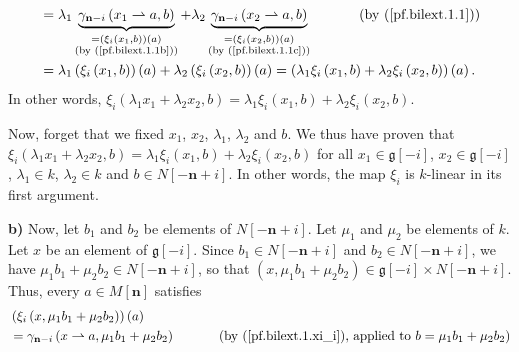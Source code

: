 \documentclass[etingof-lie.tex]{subfiles}
\begin{document}
\begin{noncompile}
{\begin{align*}
&  =\lambda_{1}\underbrace{\gamma_{\mathbf{n}-i}\left(  x_{1}\rightharpoonup
a,b\right)  }_{\substack{=\left(  \xi_{i}\left(  x_{1},b\right)  \right)
\left(  a\right)  \\\text{(by (\ref{pf.bilext.1.1b}))}}}+\lambda
_{2}\underbrace{\gamma_{\mathbf{n}-i}\left(  x_{2}\rightharpoonup a,b\right)
}_{\substack{=\left(  \xi_{i}\left(  x_{2},b\right)  \right)  \left(
a\right)  \\\text{(by (\ref{pf.bilext.1.1c}))}}}\ \ \ \ \ \ \ \ \ \ \left(
\text{by (\ref{pf.bilext.1.1})}\right) \\
&  =\lambda_{1}\left(  \xi_{i}\left(  x_{1},b\right)  \right)  \left(
a\right)  +\lambda_{2}\left(  \xi_{i}\left(  x_{2},b\right)  \right)  \left(
a\right)  =\left(  \lambda_{1}\xi_{i}\left(  x_{1},b\right)  +\lambda_{2}%
\xi_{i}\left(  x_{2},b\right)  \right)  \left(  a\right)  .
\end{align*}
In other words, $\xi_{i}\left(  \lambda_{1}x_{1}+\lambda_{2}x_{2},b\right)
=\lambda_{1}\xi_{i}\left(  x_{1},b\right)  +\lambda_{2}\xi_{i}\left(
x_{2},b\right)  $.
\par
Now, forget that we fixed $x_{1}$, $x_{2}$, $\lambda_{1}$, $\lambda_{2}$ and
$b$. We thus have proven that $\xi_{i}\left(  \lambda_{1}x_{1}+\lambda
_{2}x_{2},b\right)  =\lambda_{1}\xi_{i}\left(  x_{1},b\right)  +\lambda_{2}%
\xi_{i}\left(  x_{2},b\right)  $ for all $x_{1}\in\mathfrak{g}\left[
-i\right]  $, $x_{2}\in\mathfrak{g}\left[  -i\right]  $, $\lambda_{1}\in k$,
$\lambda_{2}\in k$ and $b\in N\left[  -\mathbf{n}+i\right]  $. In other words,
the map $\xi_{i}$ is $k$-linear in its first argument.
\par
\textbf{b)} Now, let $b_{1}$ and $b_{2}$ be elements of $N\left[
-\mathbf{n}+i\right]  $. Let $\mu_{1}$ and $\mu_{2}$ be elements of $k$. Let
$x$ be an element of $\mathfrak{g}\left[  -i\right]  $. Since $b_{1}\in
N\left[  -\mathbf{n}+i\right]  $ and $b_{2}\in N\left[  -\mathbf{n}+i\right]
$, we have $\mu_{1}b_{1}+\mu_{2}b_{2}\in N\left[  -\mathbf{n}+i\right]  $, so
that $\left(  x,\mu_{1}b_{1}+\mu_{2}b_{2}\right)  \in\mathfrak{g}\left[
-i\right]  \times N\left[  -\mathbf{n}+i\right]  $. Thus, every $a\in M\left[
\mathbf{n}\right]  $ satisfies%
\begin{align}
&  \left(  \xi_{i}\left(  x,\mu_{1}b_{1}+\mu_{2}b_{2}\right)  \right)  \left(
a\right) \nonumber\\
&  =\gamma_{\mathbf{n}-i}\left(  x\rightharpoonup a,\mu_{1}b_{1}+\mu_{2}%
b_{2}\right)  \ \ \ \ \ \ \ \ \ \ \left(  \text{by (\ref{pf.bilext.1.xi_i}),
applied to }b=\mu_{1}b_{1}+\mu_{2}b_{2}\right) \nonumber\\

\end{align}}
\end{noncompile}
\end{document}
